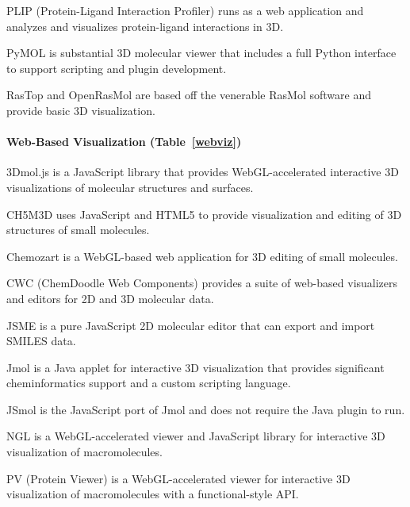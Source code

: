 PLIP (Protein-Ligand Interaction Profiler) \cite{Salentin_2015} runs as a web application and analyzes and visualizes protein-ligand interactions in 3D.

PyMOL is substantial 3D molecular viewer that includes a full Python interface to support scripting and plugin development.

RasTop and OpenRasMol are based off the venerable RasMol software and provide basic 3D visualization. 

\paragraph{Web-Based Visualization (Table~\ref{webviz})}

3Dmol.js \cite{Rego_2014} is a JavaScript library that provides WebGL-accelerated interactive 3D visualizations of molecular structures and surfaces.

CH5M3D \cite{Earley_2013} uses JavaScript and HTML5 to provide visualization and editing of 3D structures of small molecules.

Chemozart \cite{Mohebifar_2015} is a WebGL-based web application for 3D editing of small molecules.

CWC (ChemDoodle Web Components) \cite{Burger_2015} provides a suite of web-based visualizers and editors for 2D and 3D molecular data.

JSME \cite{Bienfait_2013} is a pure JavaScript 2D molecular editor that can export and import SMILES data.

Jmol \cite{Hanson_2010} is a Java applet for interactive 3D visualization that provides significant cheminformatics support and a custom scripting language.

JSmol \cite{Hanson_2013} is the JavaScript port of Jmol and does not require the Java plugin to run.

NGL \cite{Rose_2015} is a WebGL-accelerated viewer and JavaScript library for interactive 3D visualization of macromolecules.

PV (Protein Viewer) \cite{95f13b46-4e83-4cdd-afc0-6de07bca5ae8} is a WebGL-accelerated viewer for interactive 3D visualization of macromolecules with a functional-style API.




